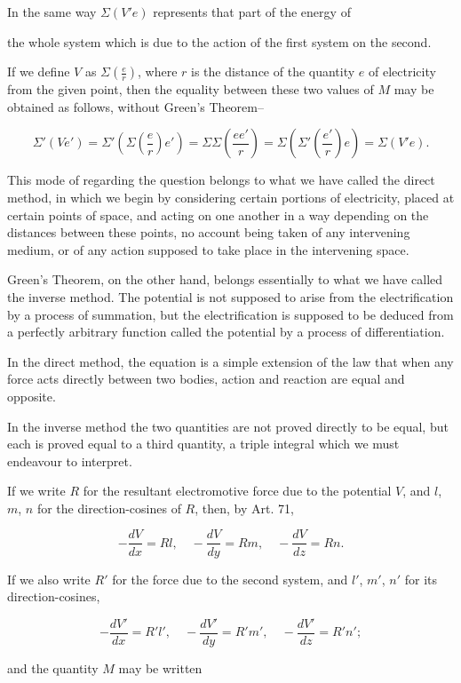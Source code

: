 \documentclass[11pt,a4paper]{article}
\begin{document}
In the same way $\Sigma(V'e)$ represents that part of the energy of

the whole system which is due to the action of the first system on the second.

If we define $V$ as $\Sigma\left(\frac{e}{r}\right)$, where $r$ is the distance of the quantity $e$ of electricity from the given point, then the equality between these two values of $M$ may be obtained as follows, without Green's Theorem--

\[
\Sigma'(Ve') = \Sigma'\left(\Sigma\left(\frac{e}{r}\right)e'\right) = \Sigma\Sigma\left(\frac{ee'}{r}\right) = \Sigma\left(\Sigma'\left(\frac{e'}{r}\right)e\right) = \Sigma(V'e).
\]

This mode of regarding the question belongs to what we have called the direct method, in which we begin by considering certain portions of electricity, placed at certain points of space, and acting on one another in a way depending on the distances between these points, no account being taken of any intervening medium, or of any action supposed to take place in the intervening space.

Green's Theorem, on the other hand, belongs essentially to what we have called the inverse method. The potential is not supposed to arise from the electrification by a process of summation, but the electrification is supposed to be deduced from a perfectly arbitrary function called the potential by a process of differentiation.

In the direct method, the equation is a simple extension of the law that when any force acts directly between two bodies, action and reaction are equal and opposite.

In the inverse method the two quantities are not proved directly to be equal, but each is proved equal to a third quantity, a triple integral which we must endeavour to interpret.

If we write $R$ for the resultant electromotive force due to the potential $V$, and $l$, $m$, $n$ for the direction-cosines of $R$, then, by Art. 71,

\[
-\frac{dV}{dx} = Rl, \quad -\frac{dV}{dy} = Rm, \quad -\frac{dV}{dz} = Rn.
\]

If we also write $R'$ for the force due to the second system, and $l'$, $m'$, $n'$ for its direction-cosines,

\[
-\frac{dV'}{dx} = R'l', \quad -\frac{dV'}{dy} = R'm', \quad -\frac{dV'}{dz} = R'n';
\]

and the quantity $M$ may be written
\end{document}
